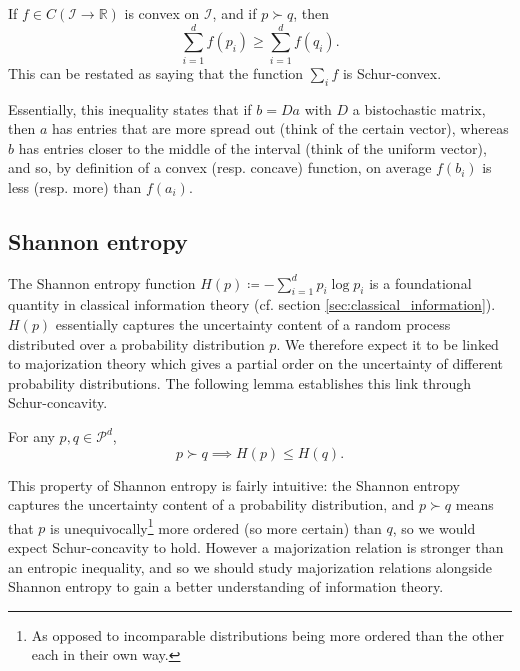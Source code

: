 \begin{lemma} \label{lem:karamata}
    If $f \in C(\mathcal{I} \to \mathbb{R})$ is convex on $\mathcal{I}$, and if $p \succ q$, then
    \begin{equation}
        \sum_{i=1}^{d} f(p_i) \geq \sum_{i=1}^{d} f(q_i).
    \end{equation}
    This can be restated as saying that the function $\sum_i f$ is Schur-convex.
\end{lemma}

Essentially, this inequality states that if $b = Da$ with $D$ a bistochastic matrix, then $a$ has entries that are more spread out (think of the certain vector), whereas $b$ has entries closer to the middle of the interval (think of the uniform vector), and so, by definition of a convex (resp. concave) function, on average $f(b_i)$ is less (resp. more) than $f(a_i)$.



\subsection{Shannon entropy} \label{sec:schur_shannon}

The Shannon entropy function $H(p) \coloneqq - \sum_{i = 1}^{d} p_i \log p_i$ is a foundational quantity in classical information theory (cf. section \ref{sec:classical_information}). $H(p)$ essentially captures the uncertainty content of a random process distributed over a probability distribution $p$. We therefore expect it to be linked to majorization theory which gives a partial order on the uncertainty of different probability distributions. The following lemma establishes this link through Schur-concavity.

\begin{lemma}
    For any $p, q \in \mathcal{P}^d$,
    \begin{equation}
        p \succ q \implies  H(p) \leq H(q).
    \end{equation}
\end{lemma}

This property of Shannon entropy is fairly intuitive: the Shannon entropy captures the uncertainty content of a probability distribution, and $p \succ q$ means that $p$ is unequivocally\footnote{As opposed to incomparable distributions being more ordered than the other each in their own way.} more ordered (so more certain) than $q$, so we would expect Schur-concavity to hold. However a majorization relation is stronger than an entropic inequality, and so we should study majorization relations alongside Shannon entropy to gain a better understanding of information theory.

